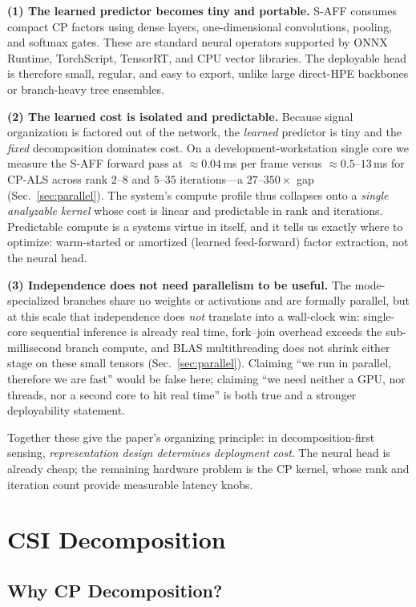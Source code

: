 \documentclass[10pt,conference]{IEEEtran}
\begin{document}
\textbf{(1) The learned predictor becomes tiny and portable.}
S-AFF consumes compact CP factors using dense layers, one-dimensional convolutions, pooling, and softmax gates. These are standard neural operators supported by ONNX Runtime, TorchScript, TensorRT, and CPU vector libraries. The deployable head is therefore small, regular, and easy to export, unlike large direct-HPE backbones or branch-heavy tree ensembles.

\textbf{(2) The learned cost is isolated and predictable.}
Because signal organization is factored out of the network, the \emph{learned} predictor is tiny and the \emph{fixed} decomposition dominates cost. On a development-workstation single core we measure the S-AFF forward pass at $\approx0.04$\,ms per frame versus $\approx0.5$--$13$\,ms for CP-ALS across rank $2$--$8$ and $5$--$35$ iterations---a $27$--$350\times$ gap (Sec.~\ref{sec:parallel}). The system's compute profile thus collapses onto a \emph{single analyzable kernel} whose cost is linear and predictable in rank and iterations. Predictable compute is a systems virtue in itself, and it tells us exactly where to optimize: warm-started or amortized (learned feed-forward) factor extraction, not the neural head.

\textbf{(3) Independence does not need parallelism to be useful.}
The mode-specialized branches share no weights or activations and are formally parallel, but at this scale that independence does \emph{not} translate into a wall-clock win: single-core sequential inference is already real time, fork--join overhead exceeds the sub-millisecond branch compute, and BLAS multithreading does not shrink either stage on these small tensors (Sec.~\ref{sec:parallel}). Claiming ``we run in parallel, therefore we are fast'' would be false here; claiming ``we need neither a GPU, nor threads, nor a second core to hit real time'' is both true and a stronger deployability statement.

Together these give the paper's organizing principle: in decomposition-first sensing, \emph{representation design determines deployment cost}. The neural head is already cheap; the remaining hardware problem is the CP kernel, whose rank and iteration count provide measurable latency knobs.

\section{CSI Decomposition}

\subsection{Why CP Decomposition?}
\end{document}
